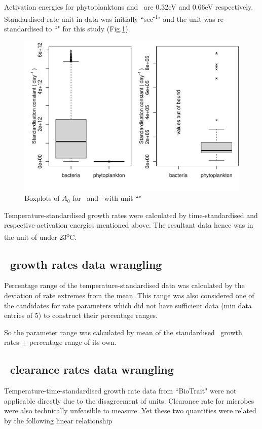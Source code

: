 \documentclass[../thesis.tex]{subfiles} %
\begin{document}
Activation energies for phytoplanktons and \bac\ are 0.32eV and 0.66eV respectively\autocite{regaudie2012temperature}.  Standardised rate unit in data was initially ``sec\textsuperscript{-1}" and the unit was re-standardised to ``\dayU" for this study (Fig.\ref{f:A0}).

\begin{figure}[H]
    \centering
    \includegraphics[width=\linewidth]{../result/stdCst.pdf}
    \caption[Boxplot of standardised $A_0$]{Boxplots of $A_0$ for \phy\ and \bac\ with unit ``\dayU"}
    \label{f:A0}
\end{figure}

Temperature-standardised growth rates were calculated by time-standardised and respective activation energies mentioned above.  The resultant data hence was in the unit of \dayU under 23\textsuperscript{o}C.

\subsection{\Phy\ growth rates data wrangling}
Percentage range of the temperature-standardised data was calculated by the deviation of rate extremes from the mean.  This range was also considered one of the candidates for rate parameters which did not have sufficient data (min data entries of 5) to construct their percentage ranges.

So the parameter range was calculated by mean of the standardised \phy\ growth rates $\pm$ percentage range of its own.

\subsection{\Bac\ clearance rates data wrangling}
Temperature-time-standardised growth rate data from ``BioTrait" were not applicable directly due to the disagreement of units.  Clearance rate for microbes were also technically unfeasible to measure.  Yet these two quantities were related by the following linear relationship
\end{document}
